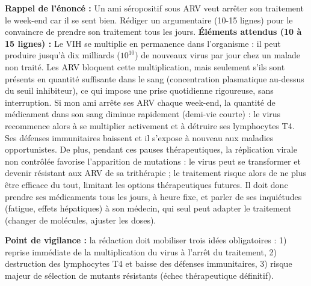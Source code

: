 \documentclass[11pt]{article}
\newcommand{\cle}[1]{{\popxbold\color{popdark}#1}}
\begin{document}
\begin{corrige}
\textbf{Rappel de l'énoncé :} Un ami séropositif sous ARV veut arrêter son traitement le week-end car il se sent bien. Rédiger un argumentaire (10-15 lignes) pour le convaincre de prendre son traitement tous les jours.
\tcblower
\textbf{Éléments attendus (10 à 15 lignes) :}
Le VIH se multiplie en permanence dans l'organisme : il peut produire jusqu'à dix milliards ($10^{10}$) de nouveaux virus par jour chez un malade non traité. Les ARV bloquent cette multiplication, mais seulement s'ils sont présents en quantité suffisante dans le sang (concentration plasmatique au-dessus du seuil inhibiteur), ce qui impose une prise quotidienne rigoureuse, sans interruption. Si mon ami arrête ses ARV chaque week-end, la quantité de médicament dans son sang diminue rapidement (demi-vie courte) : le virus recommence alors à se multiplier activement et à détruire ses lymphocytes T4. Ses défenses immunitaires baissent et il s'expose à nouveau aux maladies opportunistes. De plus, pendant ces pauses thérapeutiques, la réplication virale non contrôlée favorise l'apparition de mutations : le virus peut se transformer et devenir \cle{résistant} aux ARV de sa trithérapie ; le traitement risque alors de ne plus être efficace du tout, limitant les options thérapeutiques futures. Il doit donc prendre ses médicaments tous les jours, à heure fixe, et parler de ses inquiétudes (fatigue, effets hépatiques) à son médecin, qui seul peut adapter le traitement (changer de molécules, ajuster les doses).

\textbf{Point de vigilance :} la rédaction doit mobiliser trois idées obligatoires : 1) reprise immédiate de la multiplication du virus à l'arrêt du traitement, 2) destruction des lymphocytes T4 et baisse des défenses immunitaires, 3) risque majeur de sélection de mutants résistants (échec thérapeutique définitif).
\end{corrige}
\end{document}
